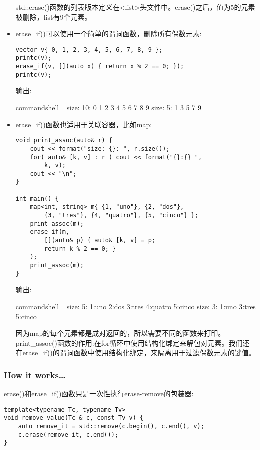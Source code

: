 \begin{itemize}
std::erase()函数的列表版本定义在<list>头文件中。erase()之后，值为5的元素被删除，list有9个元素。

\item 
erase\_if()可以使用一个简单的谓词函数，删除所有偶数元素:

\begin{lstlisting}[style=styleCXX]
vector v{ 0, 1, 2, 3, 4, 5, 6, 7, 8, 9 };
printc(v);
erase_if(v, [](auto x) { return x % 2 == 0; });
printc(v);
\end{lstlisting}

输出:

\begin{tcblisting}{commandshell={}}
size: 10: 0 1 2 3 4 5 6 7 8 9
size: 5: 1 3 5 7 9
\end{tcblisting}

\item 
erase\_if()函数也适用于关联容器，比如map:

\begin{lstlisting}[style=styleCXX]
void print_assoc(auto& r) {
	cout << format("size: {}: ", r.size());
	for( auto& [k, v] : r ) cout << format("{}:{} ",
		k, v);
	cout << "\n";
}

int main() {
	map<int, string> m{ {1, "uno"}, {2, "dos"},
		{3, "tres"}, {4, "quatro"}, {5, "cinco"} };
	print_assoc(m);
	erase_if(m,
		[](auto& p) { auto& [k, v] = p;
		return k % 2 == 0; }
	);
	print_assoc(m);
}
\end{lstlisting}

输出:

\begin{tcblisting}{commandshell={}}
size: 5: 1:uno 2:dos 3:tres 4:quatro 5:cinco
size: 3: 1:uno 3:tres 5:cinco
\end{tcblisting}

因为map的每个元素都是成对返回的，所以需要不同的函数来打印。print\_assoc()函数的作用:在for循环中使用结构化绑定来解包对元素。我们还在erase\_if()的谓词函数中使用结构化绑定，来隔离用于过滤偶数元素的键值。
\end{itemize}

\subsubsection{How it works…}

erase()和erase\_if()函数只是一次性执行erase-remove的包装器:

\begin{lstlisting}[style=styleCXX]
template<typename Tc, typename Tv>
void remove_value(Tc & c, const Tv v) {
	auto remove_it = std::remove(c.begin(), c.end(), v);
	c.erase(remove_it, c.end());
}
\end{lstlisting}

